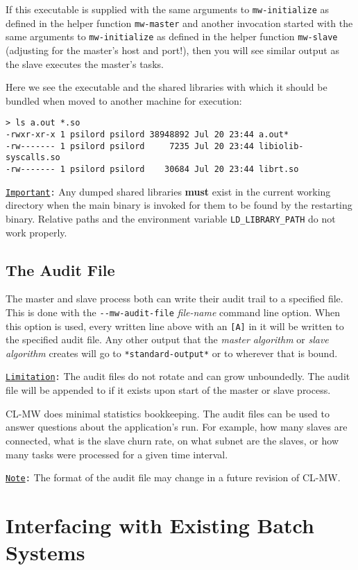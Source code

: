 \documentclass[titlepage,12pt]{book}
\newcommand{\xsmall}{\latexhtml{\small}{}}
\newcommand{\xnormalsize}{\latexhtml{\normalsize}{}}
\newcommand{\clmw}{\xsmall\textsc{CL-MW}\xnormalsize\xspace}
\newcommand{\sa}{\textit{slave algorithm}\xspace}
\newcommand{\ma}{\textit{master algorithm}\xspace}
\newcommand{\dash}{\texttt{-}}
\newcommand{\func}[1]{\mbox{\texttt{#1}}\xspace}
\newcommand{\bold}[1]{\textbf{#1}\xspace}
\newcommand{\var}[1]{\texttt{#1}\xspace}
\newcommand{\EnvVar}[1]{\texttt{#1}\xspace}
\newcommand{\OptionV}[2]{\dash\dash\texttt{#1} \textit{#2}}
\newcommand{\Note}{\texttt{\underline{Note}:}\xspace}
\newcommand{\Important}{\texttt{\underline{Important}:}\xspace}
\newcommand{\Limitation}{\texttt{\underline{Limitation}:}\xspace}
\begin{document}
If this executable is supplied with the same arguments
to \func{mw-initialize} as defined in the helper function
\func{mw-master} and another invocation started with the same
arguments to \func{mw-initialize} as defined in the helper function
\func{mw-slave} (adjusting for the master's host and port!), then
you will see similar output as the slave executes the master's tasks.

Here we see the executable and the shared libraries with which it should be
bundled when moved to another machine for execution:

\small
\begin{verbatim}
> ls a.out *.so
-rwxr-xr-x 1 psilord psilord 38948892 Jul 20 23:44 a.out*
-rw------- 1 psilord psilord     7235 Jul 20 23:44 libiolib-syscalls.so
-rw------- 1 psilord psilord    30684 Jul 20 23:44 librt.so
\end{verbatim}
\normalsize

\Important Any dumped shared libraries \bold{must} exist in the
current working directory when the main binary is invoked for them to
be found by the restarting binary. Relative paths and the environment
variable \EnvVar{LD\_LIBRARY\_PATH} do not work properly.

\section{The Audit File}

The master and slave process both can write their
audit trail to a specified file. This is done with the
\OptionV{mw-audit-file}{file-name} command line option. When this
option is used, every written line above with an \texttt{[A]} in it
will be written to the specified audit file. Any other output that the
\ma or \sa creates will go to \var{*standard-output*} or to wherever
that is bound.

\Limitation The audit files do not rotate and can grow unboundedly. The
audit file will be appended to if it exists upon start of the master
or slave process.

\clmw does minimal statistics bookkeeping. The audit files can be used
to answer questions about the application's run. For example, how many
slaves are connected, what is the slave churn rate, on what subnet are
the slaves, or how many tasks were processed for a given time interval.

\Note The format of the audit file may change in a future revision of \clmw.

\chapter{Interfacing with Existing Batch Systems}
\end{document}
